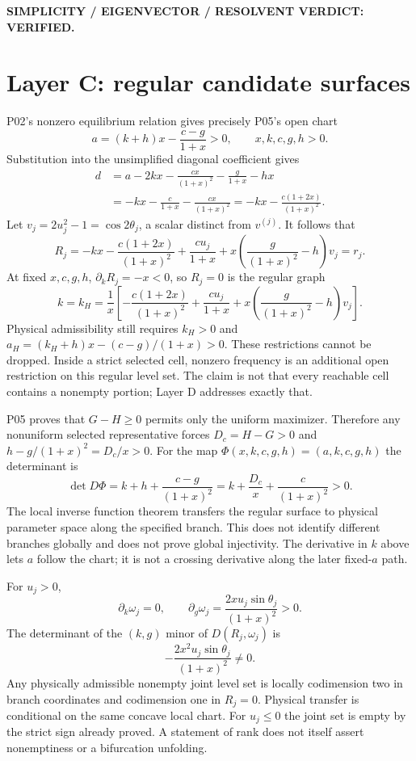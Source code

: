 \documentclass[11pt]{article}
\begin{document}
\noindent\textbf{SIMPLICITY / EIGENVECTOR / RESOLVENT VERDICT: VERIFIED.}

\section{Layer C: regular candidate surfaces}
\label{sec:C}
P02's nonzero equilibrium relation gives precisely P05's open chart
\[
 a=(k+h)x-\frac{c-g}{1+x}>0,\qquad x,k,c,g,h>0.
\]
Substitution into the unsimplified diagonal coefficient gives
\begin{align*}
 d&=a-2kx-\frac{cx}{(1+x)^2}-\frac{g}{1+x}-hx\\
  &=-kx-\frac{c}{1+x}-\frac{cx}{(1+x)^2}
   =-kx-\frac{c(1+2x)}{(1+x)^2}.
\end{align*}
Let $v_j=2u_j^2-1=\cos2\theta_j$, a scalar distinct from $v^{(j)}$.
It follows that
\[
 R_j=-kx-\frac{c(1+2x)}{(1+x)^2}+\frac{cu_j}{1+x}
          +x\left(\frac{g}{(1+x)^2}-h\right)v_j=r_j.
\]
At fixed $x,c,g,h$, $\partial_kR_j=-x<0$, so $R_j=0$ is the
regular graph
\[
 k=k_H=\frac1x\left[-\frac{c(1+2x)}{(1+x)^2}
       +\frac{cu_j}{1+x}
       +x\left(\frac{g}{(1+x)^2}-h\right)v_j\right].
\]
Physical admissibility still requires $k_H>0$ and
$a_H=(k_H+h)x-(c-g)/(1+x)>0$. These restrictions cannot be dropped.
Inside a strict selected cell, nonzero frequency is an additional open
restriction on this regular level set. The claim is not that every
reachable cell contains a nonempty portion; Layer D addresses exactly that.

P05 proves that $G-H\ge0$ permits only the uniform maximizer. Therefore
any nonuniform selected representative forces $D_c=H-G>0$ and
$h-g/(1+x)^2=D_c/x>0$. For the map
$\Phi(x,k,c,g,h)=(a,k,c,g,h)$ the determinant is
\[
 \det D\Phi=k+h+\frac{c-g}{(1+x)^2}
       =k+\frac{D_c}{x}+\frac{c}{(1+x)^2}>0.
\]
The local inverse function theorem transfers the regular surface to
physical parameter space along the specified branch. This does not
identify different branches globally and does not prove global injectivity.
The derivative in $k$ above lets $a$ follow the chart; it is not a
crossing derivative along the later fixed-$a$ path.

For $u_j>0$,
\[
 \partial_k\omega_j=0,\qquad
 \partial_g\omega_j=\frac{2xu_j\sin\theta_j}{(1+x)^2}>0.
\]
The determinant of the $(k,g)$ minor of $D(R_j,\omega_j)$ is
\[
 -\frac{2x^2u_j\sin\theta_j}{(1+x)^2}\ne0.
\]
Any physically admissible nonempty joint level set is locally codimension
two in branch coordinates and codimension one in $R_j=0$. Physical
transfer is conditional on the same concave local chart. For $u_j\le0$
the joint set is empty by the strict sign already proved. A statement of
rank does not itself assert nonemptiness or a bifurcation unfolding.
\end{document}
